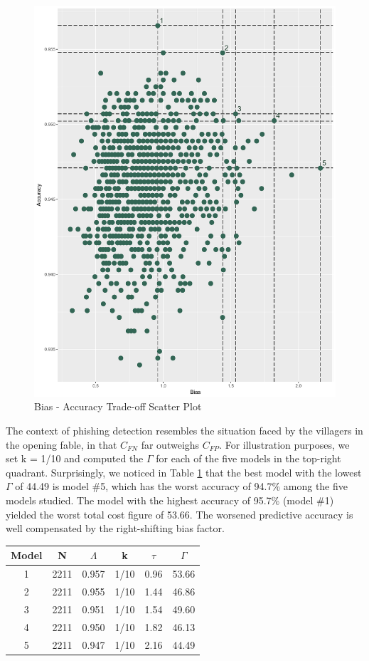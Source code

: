 \documentclass[]{interact}
\theoremstyle{plain}%
\theoremstyle{definition}
\theoremstyle{remark}
\begin{document}
\begin{figure}
\centering	
	\includegraphics[width=0.65\linewidth]{Rplot04.pdf}
	\caption{Bias - Accuracy Trade-off Scatter Plot}
	\label{fig1}
\end{figure}

The context of phishing detection resembles the situation faced by the villagers  in the opening fable, in that $C_{FN}$ far outweighs $C_{FP}$. For  illustration purposes,  we set k = 1/10 and computed the $\varGamma$ for each of the five models in the top-right quadrant. Surprisingly, we noticed in Table \ref{tab4} that the best model with the lowest $\varGamma$ of 44.49  is model \#5, which has the worst accuracy of 94.7\% among the five models studied. The model with the highest accuracy of 95.7\% (model \#1) yielded the worst total cost figure of 53.66. The worsened predictive accuracy is well compensated by the right-shifting bias factor.  

\begin{table}
	{\begin{tabular}{cccccc} \toprule 
			 Model &  N  &  $\varLambda$  & k & $\tau$  & $\varGamma$ \\ \midrule
			 1&2211&0.957&1/10&0.96& 53.66\\
			 2&2211&0.955&1/10&1.44& 46.86\\
			 3&2211&0.951&1/10&1.54& 49.60\\
			 4&2211&0.950&1/10&1.82& 46.13\\
			 5&2211&0.947&1/10&2.16& 44.49\\
			\bottomrule
	\end{tabular}}
	\label{tab4}
\end{table} 
 
\end{document}
